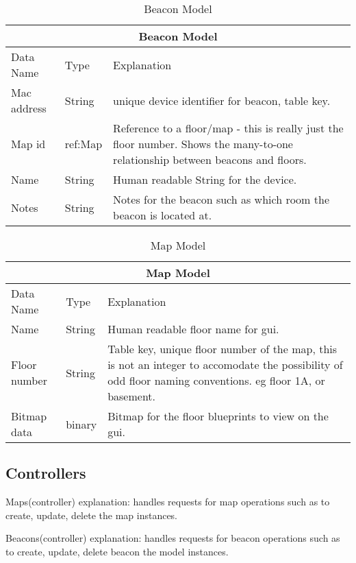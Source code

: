 \begin{table}[H]
\centering
\begin{tabular}{ | m{3cm} | m{3cm} | m{9.5cm} |}
	\hline
	\multicolumn{3}{|c|}{Beacon Model} \\
	\hline
	Data Name & Type & Explanation \\
	\hline
	Mac address & String & unique device identifier for beacon, table key.\\
	\hline
	Map id & ref:Map & Reference to a floor/map - this is really just the floor number. Shows the many-to-one relationship between beacons and floors. \\
	\hline
	Name & String & Human readable String for the device. \\
	\hline
	Notes & String & Notes for the beacon such as which room the beacon is located at. \\
	\hline
\end{tabular}
\caption{Beacon Model}
\end{table}


\begin{table}[H]
\centering
\begin{tabular}{ | m{3cm} | m{3cm} | m{9.5cm} |}
	\hline
	\multicolumn{3}{|c|}{Map Model} \\
	\hline
	Data Name & Type & Explanation \\
	\hline
	Name & String & Human readable floor name for gui. \\
	\hline
	Floor number & String & Table key, unique floor number of the map, this is not an integer to accomodate the possibility of odd floor naming conventions. eg floor 1A, or basement. \\
	\hline
	Bitmap data & binary & Bitmap for the floor blueprints to view on the gui. \\
	\hline
\end{tabular}
\caption{Map Model}
\end{table}


\subsection{Controllers}
Maps(controller)
	explanation: handles requests for map operations such as to create, update, delete the map instances.

Beacons(controller)
	explanation: handles requests for beacon operations such as to create, update, delete beacon the model instances.

